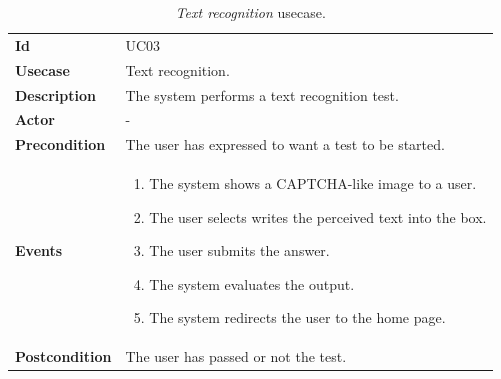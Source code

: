 \begin{table}[h!t]
    \centering
    \caption{\emph{Text recognition} usecase.}
    \label{tab:uc:text}
    \centering
    \begin{tabular}{l | p{80mm}}
        \textbf{Id}            & UC03                                                 \\
        \textbf{Usecase}       & Text recognition.                                    \\
        \textbf{Description}   & The system performs a text recognition test.         \\
        \textbf{Actor}         & -                                                    \\
        \textbf{Precondition}  & The user has expressed to want a test to be started. \\
        \textbf{Events}        & \begin{enumerate}
            \item The system shows a CAPTCHA-like image to a user.
            \item The user selects writes the perceived text into the box.
            \item The user submits the answer.
            \item The system evaluates the output.
            \item The system redirects the user to the home page.
        \end{enumerate}                            \\
        \textbf{Postcondition} & The user has passed or not the test.
    \end{tabular}
\end{table}

